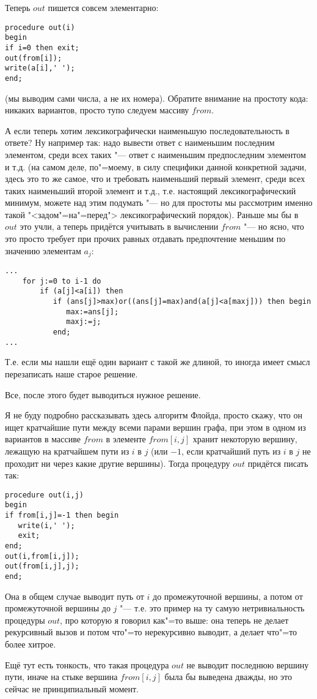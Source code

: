 Теперь $out$ пишется совсем элементарно:
\begin{codesampleo}\begin{verbatim}
procedure out(i)
begin
if i=0 then exit;
out(from[i]);
write(a[i],' ');
end;
\end{verbatim}\end{codesampleo}
(мы выводим сами числа, а не их номера). Обратите внимание на простоту кода: никаких вариантов, просто тупо следуем массиву $from$.

А если теперь хотим лексикографически наименьшую последовательность в ответе? Ну например так: надо вывести ответ с наименьшим последним элементом, среди всех таких "--- ответ с наименьшим предпоследним элементом и т.д. (на самом деле, по"=моему, в силу специфики данной конкретной задачи, здесь это то же самое, что и требовать наименьший первый элемент, среди всех таких наименьший второй элемент и т.д., т.е. настоящий лексикографический минимум, можете над этим подумать "--- но для простоты мы рассмотрим именно такой "<задом"=на"=перед"> лексикографический порядок). Раньше мы бы в $out$ это учли, а теперь придётся учитывать в вычислении $from$ "--- но ясно, что это просто требует при прочих равных отдавать предпочтение меньшим по значению элементам $a_j$:
\begin{codesampleo}\begin{verbatim}
...
    for j:=0 to i-1 do
        if (a[j]<a[i]) then
           if (ans[j]>max)or((ans[j]=max)and(a[j]<a[maxj])) then begin
              max:=ans[j];
              maxj:=j;
           end;
...
\end{verbatim}\end{codesampleo}
Т.е. если мы нашли ещё один вариант с такой же длиной, то иногда имеет смысл перезаписать наше старое решение.

Все, после этого будет выводиться нужное решение.

Я не буду подробно рассказывать здесь алгоритм Флойда, просто скажу, что он ищет кратчайшие пути между всеми парами вершин графа, при этом в одном из вариантов в массиве $from$ в элементе $from[i,j]$ хранит некоторую вершину, лежащую на кратчайшем пути из $i$ в $j$ (или $-1$, если кратчайший путь из $i$ в $j$ не проходит ни через какие другие вершины). Тогда процедуру $out$ придётся писать так:
\begin{codesampleo}\begin{verbatim}
procedure out(i,j)
begin
if from[i,j]=-1 then begin
   write(i,' ');
   exit;
end;
out(i,from[i,j]);
out(from[i,j],j);
end;
\end{verbatim}\end{codesampleo}

Она в общем случае выводит путь от $i$ до промежуточной вершины, а потом от промежуточной вершины до $j$ "--- т.е. это пример на ту самую нетривиальность процедуры $out$, про которую я говорил как"=то выше: она теперь не делает рекурсивный вызов и потом что"=то нерекурсивно выводит, а делает что"=то более хитрое.

Ещё тут есть тонкость, что такая процедура $out$ не выводит последнюю вершину пути, иначе на стыке вершина $from[i,j]$ была бы выведена дважды, но это сейчас не принципиальный момент.
